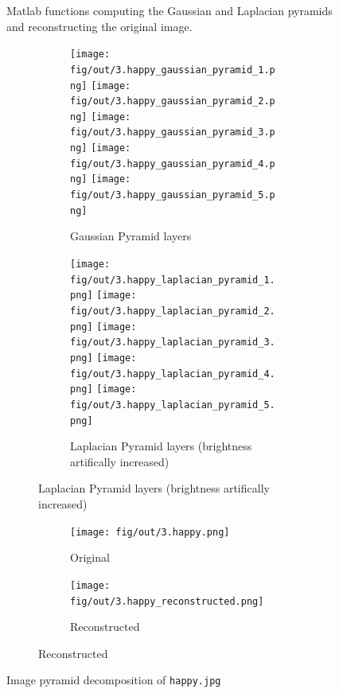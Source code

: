 \documentclass[tikz,14pt,fleqn]{article}
\begin{document}
\begin{figure}[h!]
    \vspace*{-0.2cm}
    \inputminted[firstline=57, frame=lines, framesep=2mm, fontsize=\small ]{matlab}{../src/ex3.m}
    \vspace*{-0.5cm}
    \caption{Matlab functions computing the Gaussian and Laplacian pyramids and reconstructing the original image.}
    \label{fig:3.code}
\end{figure}

\begin{figure}[h!]
    \centering
    \begin{subfigure}[t]{.7\linewidth}
        \begin{subfigure}[t]{\linewidth}
            \texttt{[image: fig/out/3.happy\_gaussian\_pyramid\_1.png]}
            \texttt{[image: fig/out/3.happy\_gaussian\_pyramid\_2.png]}
            \texttt{[image: fig/out/3.happy\_gaussian\_pyramid\_3.png]}
            \texttt{[image: fig/out/3.happy\_gaussian\_pyramid\_4.png]}
            \texttt{[image: fig/out/3.happy\_gaussian\_pyramid\_5.png]}
            \caption{Gaussian Pyramid layers}
            \label{fig:3.gaussian_pyramid}
        \end{subfigure}
        \begin{subfigure}[t]{\linewidth}
            \texttt{[image: fig/out/3.happy\_laplacian\_pyramid\_1.png]}
            \texttt{[image: fig/out/3.happy\_laplacian\_pyramid\_2.png]}
            \texttt{[image: fig/out/3.happy\_laplacian\_pyramid\_3.png]}
            \texttt{[image: fig/out/3.happy\_laplacian\_pyramid\_4.png]}
            \texttt{[image: fig/out/3.happy\_laplacian\_pyramid\_5.png]}     
            \caption{Laplacian Pyramid layers (brightness artifically increased)}
            \label{fig:3.laplacian_pyramid}
        \end{subfigure}
    \end{subfigure}
    \begin{subfigure}[t]{.15\linewidth}
        \centering
        \begin{subfigure}[t]{\linewidth}
            \centering
            \texttt{[image: fig/out/3.happy.png]}
            \caption{Original}
            \label{fig:3.original}
        \end{subfigure}
        \begin{subfigure}[t]{\linewidth}
            \centering
            \texttt{[image: fig/out/3.happy\_reconstructed.png]}
            \caption{Reconstructed}
            \label{fig:3.reconstructed}
        \end{subfigure}
    \end{subfigure}
    \caption{Image pyramid decomposition of \texttt{happy.jpg}}
    \label{fig:3.pyramids}
    \vspace*{-0.5cm}
\end{figure}
\end{document}
